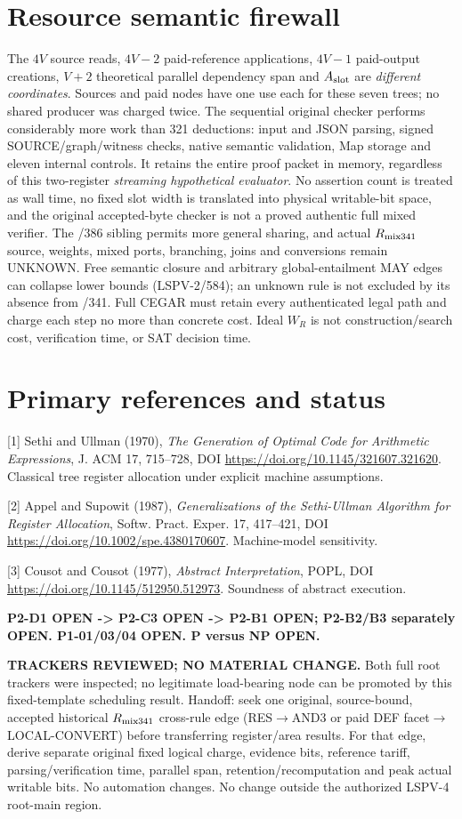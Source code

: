 \documentclass[11pt]{article}
\begin{document}
\section*{Resource semantic firewall}
The $4V$ source reads, $4V-2$ paid-reference applications, $4V-1$ paid-output creations, $V+2$ theoretical parallel dependency span and $A_{\rm slot}$ are \emph{different coordinates}. Sources and paid nodes have one use each for these seven trees; no shared producer was charged twice. The sequential original checker performs considerably more work than 321 deductions: input and JSON parsing, signed SOURCE/graph/witness checks, native semantic validation, Map storage and eleven internal controls. It retains the entire proof packet in memory, regardless of this two-register \emph{streaming hypothetical evaluator}. No assertion count is treated as wall time, no fixed slot width is translated into physical writable-bit space, and the original accepted-byte checker is not a proved authentic full mixed verifier. The /386 sibling permits more general sharing, and actual $R_{\rm mix341}$ source, weights, mixed ports, branching, joins and conversions remain UNKNOWN. Free semantic closure and arbitrary global-entailment MAY edges can collapse lower bounds (LSPV-2/584); an unknown rule is not excluded by its absence from /341. Full CEGAR must retain every authenticated legal path and charge each step no more than concrete cost. Ideal $W_R$ is not construction/search cost, verification time, or SAT decision time.

\section*{Primary references and status}
[1] Sethi and Ullman (1970), \emph{The Generation of Optimal Code for Arithmetic Expressions}, J. ACM 17, 715--728, DOI \url{https://doi.org/10.1145/321607.321620}. Classical tree register allocation under explicit machine assumptions.

[2] Appel and Supowit (1987), \emph{Generalizations of the Sethi-Ullman Algorithm for Register Allocation}, Softw. Pract. Exper. 17, 417--421, DOI \url{https://doi.org/10.1002/spe.4380170607}. Machine-model sensitivity.

[3] Cousot and Cousot (1977), \emph{Abstract Interpretation}, POPL, DOI \url{https://doi.org/10.1145/512950.512973}. Soundness of abstract execution.

\noindent\textbf{P2-D1 OPEN -> P2-C3 OPEN -> P2-B1 OPEN; P2-B2/B3 separately OPEN. P1-01/03/04 OPEN. P versus NP OPEN.}

\noindent\textbf{TRACKERS REVIEWED; NO MATERIAL CHANGE.} Both full root trackers were inspected; no legitimate load-bearing node can be promoted by this fixed-template scheduling result. Handoff: seek one original, source-bound, accepted historical $R_{\rm mix341}$ cross-rule edge (RES$\to$AND3 or paid DEF facet$\to$LOCAL-CONVERT) before transferring register/area results. For that edge, derive separate original fixed logical charge, evidence bits, reference tariff, parsing/verification time, parallel span, retention/recomputation and peak actual writable bits. No automation changes. No change outside the authorized LSPV-4 root-main region.
\end{document}
